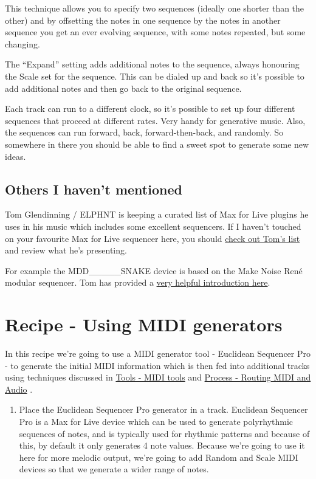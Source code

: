 \documentclass[
  12pt,
  letterpaper,
  oneside,
  open=any]{scrbook}
\providecommand{\tightlist}{%
  \setlength{\itemsep}{0pt}\setlength{\parskip}{0pt}}\usepackage{longtable,booktabs,array}
\begin{document}
This technique allows you to specify two sequences (ideally one shorter
than the other) and by offsetting the notes in one sequence by the notes
in another sequence you get an ever evolving sequence, with some notes
repeated, but some changing.

The ``Expand'' setting adds additional notes to the sequence, always
honouring the Scale set for the sequence. This can be dialed up and back
so it's possible to add additional notes and then go back to the
original sequence.

Each track can run to a different clock, so it's possible to set up four
different sequences that proceed at different rates. Very handy for
generative music. Also, the sequences can run forward, back,
forward-then-back, and randomly. So somewhere in there you should be
able to find a sweet spot to generate some new ideas.

\section{Others I haven't mentioned}\label{others-i-havent-mentioned}

Tom Glendinning / ELPHNT is keeping a curated list of Max for Live
plugins he uses in his music which includes some excellent sequencers.
If I haven't touched on your favourite Max for Live sequencer here, you
should \href{https://elphnt.io/max-for-live-curated/}{check out Tom's
list} and review what he's presenting.

For example the MDD\_\_\_\_\_SNAKE device is based on the Make Noise
René modular sequencer. Tom has provided a
\href{https://www.youtube.com/watch?v=v2_mdrz9XrU}{very helpful
introduction here}.


\chapter{Recipe - Using MIDI
generators}\label{Chapter-013-Recipe-MIDI_generators}

In this recipe we're going to use a MIDI generator tool - Euclidean
Sequencer Pro - to generate the initial MIDI information which is then
fed into additional tracks using techniques discussed in
\hyperref[Chapter-004-Tools-MIDI_tools]{Tools - MIDI tools} and
\hyperref[Chapter-005-Process-Routing]{Process - Routing MIDI and Audio}
.

\begin{enumerate}
\def\labelenumi{\arabic{enumi}.}
\tightlist
\item
  Place the Euclidean Sequencer Pro generator in a track. Euclidean
  Sequencer Pro is a Max for Live device which can be used to generate
  polyrhythmic sequences of notes, and is typically used for rhythmic
  patterns and because of this, by default it only generates 4 note
  values. Because we're going to use it here for more melodic output,
  we're going to add Random and Scale MIDI devices so that we generate a
  wider range of notes.
\end{enumerate}
\end{document}
